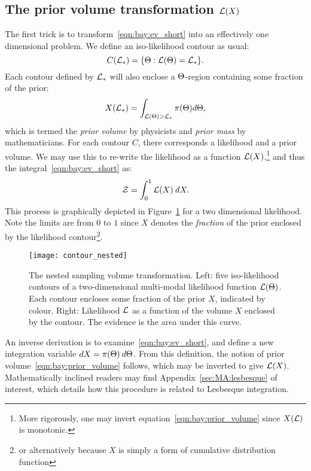 \subsection{The prior volume transformation $\mathcal{L}(X)$}
The first trick is to transform~\eqref{eqn:bay:ev_short} into an effectively one dimensional problem. We define an iso-likelihood contour as usual:
\begin{equation}
  C(\mathcal{L}_\ast) = \{\Theta : \mathcal{L}(\Theta)=\mathcal{L}_\ast \}.
  \label{eqn:bay:contour_def}
\end{equation}
Each contour defined by $\mathcal{L}_\ast$ will also enclose a $\Theta$-region containing some fraction of the prior:
\begin{equation}
  X(\mathcal{L}_\ast) = \int_{\mathcal{L}(\Theta)>\mathcal{L}_\ast} \pi(\Theta) d\Theta,
  \label{eqn:bay:prior_volume}
\end{equation}
which is termed the {\em prior volume\/} by physicists and {\em prior mass\/} by mathematicians. For each contour $C$, there corresponds a likelihood and a prior volume. We may use this to re-write the likelihood as a function $\mathcal{L}(X)$.\footnote{More rigorously, one may invert equation~\protect\eqref{eqn:bay:prior_volume} since $X(\mathcal{L})$ is monotonic.} and thus the integral~\eqref{eqn:bay:ev_short} as:
\begin{equation}
  \mathcal{Z} = \int_0^1 \mathcal{L}(X)\:dX.
  \label{eqn:bay:ev_X}
\end{equation}
This process is graphically depicted in Figure~\ref{fig:bay:prior_volume} for a two dimensional likelihood. Note the limits are from $0$ to $1$ since $X$ denotes the {\em fraction\/} of the prior enclosed by the likelihood contour\footnote{or alternatively because $X$ is simply a form of cumulative distribution function}.
%
\begin{figure}
  \centering
  \texttt{[image: contour\_nested]}
  \caption{%
    The nested sampling volume transformation.
    Left: five iso-likelihood contours of a two-dimensional multi-modal likelihood function $\mathcal{L}(\Theta)$. Each contour encloses some fraction of the prior $X$, indicated by colour.
    Right: Likelihood $\mathcal{L}$ as a function of the volume $X$ enclosed by the contour. The evidence is the area under this curve.\label{fig:bay:prior_volume}
  }
\end{figure}

An inverse derivation is to examine~\eqref{eqn:bay:ev_short}, and define a new integration variable $dX = \pi(\Theta)\:d\Theta$. From this definition, the notion of prior volume~\eqref{eqn:bay:prior_volume} follows, which may be inverted to give $\mathcal{L}(X)$. Mathematically inclined readers may find Appendix~\ref{sec:MA:lesbesque} of interest, which details how this procedure is related to Lesbesque integration.


